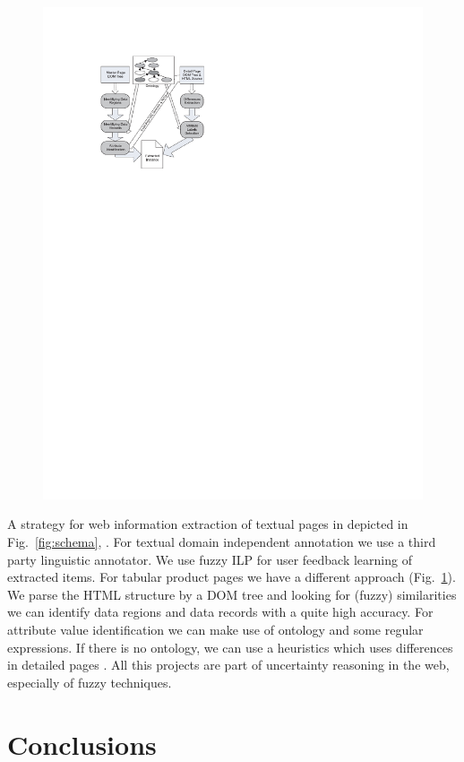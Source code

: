 \begin{figure}[ht]
\begin{minipage}[b]{0.5\hsize}
		\includegraphics[width=\hsize]{img/mdr}
\caption{}
\label{fig:mdr}
\end{minipage}
\end{figure}


     A strategy for web information extraction of textual pages in depicted in Fig.~\ref{fig:schema}, \cite{35}. For textual domain independent annotation we use a third party linguistic annotator. We use fuzzy ILP for user feedback learning of extracted items. For tabular product pages we have a different approach (Fig.~\ref{fig:mdr}). We parse the HTML structure by a DOM tree and looking for (fuzzy) similarities we can identify data regions and data records with a quite high accuracy.  For attribute value identification we can make use of ontology and some regular expressions. If there is no ontology, we can use a heuristics which uses differences in detailed pages \cite{41}. All this projects are part of uncertainty reasoning in the web, especially of fuzzy techniques. 

\section{Conclusions}

